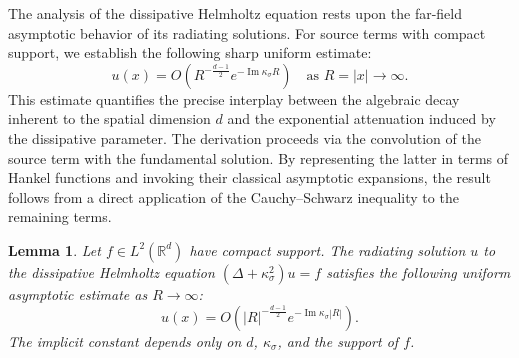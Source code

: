 \documentclass[12pt,reqno]{amsart}
\newtheorem{lemma}[theorem]{Lemma}
\numberwithin{equation}{section}
\begin{document}
The analysis of the dissipative Helmholtz equation rests upon the far-field asymptotic behavior of its radiating solutions. For source terms with compact support, we establish the following sharp uniform estimate:
\begin{equation}
    u(x) = O\left( R^{-\frac{d-1}{2}} e^{-\operatorname{Im}\kappa_\sigma R} \right) \quad \text{as }R=|x| \to \infty.
\end{equation}
This estimate quantifies the precise interplay between the algebraic decay inherent to the spatial dimension $d$ and the exponential attenuation induced by the dissipative parameter. The derivation proceeds via the convolution of the source term with the fundamental solution. By representing the latter in terms of Hankel functions and invoking their classical asymptotic expansions, the result follows from a direct application of the Cauchy--Schwarz inequality to the remaining terms.

\begin{lemma}\label{lem:far-field}
Let $f \in L^2(\mathbb{R}^d)$ have compact support. The radiating solution $u$ to the dissipative Helmholtz equation $(\Delta + \kappa_\sigma^2)u = f$ satisfies the following uniform asymptotic estimate as $R \to \infty$:
\begin{equation*}
    u(x) = O\left( |R|^{-\frac{d-1}{2}} e^{-\operatorname{Im}\kappa_\sigma |R|} \right).
\end{equation*}
The implicit constant depends only on $d$, $\kappa_\sigma$, and the support of $f$.
\end{lemma}
\end{document}
